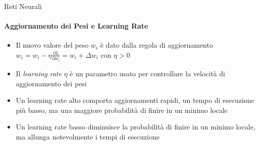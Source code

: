 \documentclass[
 ]{beamer}
\begin{document}
\begin{frame}{Reti Neurali}
    \framesubtitle{Aggiornamento dei Pesi e Learning Rate}
    
    \begin{itemize} [<+->]
        \setlength\itemsep{1.5em}
        \item \large Il nuovo valore del peso $w_i$ è dato dalla regola di aggiornamento  $w_i = w_i - \eta\frac{\partial L}{\partial w_i} = w_i + \Delta w_i$ con $\eta > 0$
        \item \large Il \emph{learning rate} $\eta$ è un parametro usato per controllare la velocità di aggiornamento dei pesi 
        \item \large Un learning rate alto comporta aggiornamenti rapidi, un tempo di esecuzione più basso, ma una maggiore probabilità di finire in un minimo locale
        \item \large Un learning rate basso diminuisce la probabilità di finire in un minimo locale, ma allunga notevolmente i tempi di esecuzione
    \end{itemize}      
\end{frame}

\end{document}
